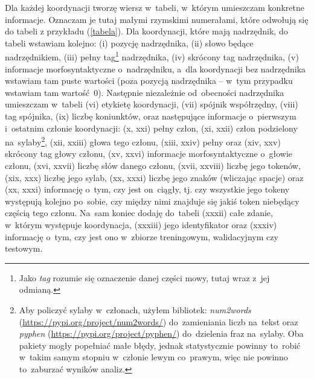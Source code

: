 \documentclass[licencjacka]{pracamgr_Kogni}
\begin{document}
    Dla każdej koordynacji tworzę wiersz w~tabeli, w~którym umieszczam konkretne informacje.
    Oznaczam je tutaj małymi rzymskimi numerałami, które odwołują się do tabeli z przykładu (\ref{tabela}).
    Dla koordynacji, które mają nadrzędnik, do tabeli wstawiam kolejno: (i) pozycję nadrzędnika, (ii) słowo będące nadrzędnikiem, (iii) pełny tag\footnote{Jako \textit{tag} rozumie się oznaczenie danej części mowy, tutaj wraz z~jej odmianą.} nadrzędnika, (iv) skrócony tag nadrzędnika, (v) informacje morfosyntaktyczne o~nadrzędniku, a~dla koordynacji bez nadrzędnika wstawiam tam puste wartości (poza pozycją nadrzędnika -- w~tym przypadku wstawiam tam wartość~0).
    Następnie niezależnie od~obecności nadrzędnika umieszczam w~tabeli (vi) etykietę koordynacji, (vii) spójnik współrzędny, (viii) tag spójnika, (ix) liczbę koniunktów, oraz następujące informacje o~pierwszym i~ostatnim członie koordynacji: (x, xxi) pełny człon, (xi, xxii) człon podzielony na~sylaby\footnote{Aby policzyć sylaby w~członach, użyłem bibliotek: \textit{num2words} (\url{https://pypi.org/project/num2words/}) do~zamieniania liczb na~tekst oraz \textit{pyphen} (\url{https://pypi.org/project/pyphen/}) do~dzielenia fraz na~sylaby. Oba pakiety mogły popełniać małe błędy, jednak statystycznie powinny to~robić w~takim samym stopniu w~członie lewym co~prawym, więc nie powinno to~zaburzać wyników analiz.}, (xii, xxiii) głowa tego członu, (xiii, xxiv) pełny oraz (xiv, xxv) skrócony tag głowy członu, (xv, xxvi) informacje morfosyntaktyczne o~głowie członu, (xvi, xxvii) liczbę słów danego członu, (xvii, xxviii) liczbę jego tokenów, (xix, xxx) liczbę jego sylab, (xx, xxxi) liczbę jego znaków (wliczając spacje) oraz (xx, xxxi) informację o~tym, czy jest on~ciągły, tj.
    czy wszystkie jego tokeny występują kolejno po~sobie, czy między nimi znajduje się jakiś token niebędący częścią tego członu.
    Na~sam koniec dodaję do~tabeli (xxxii) całe zdanie, w~którym występuje koordynacja, (xxxiii) jego identyfikator oraz (xxxiv) informację o~tym, czy jest ono w~zbiorze treningowym, walidacyjnym czy testowym.
\end{document}

